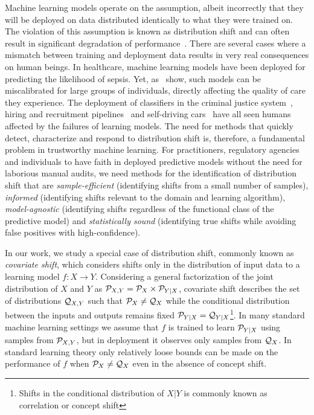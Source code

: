 Machine learning models operate on the assumption, albeit incorrectly that they will be deployed on data distributed identically to what they were trained on.
The violation of this assumption is known as distribution shift and can often result in significant degradation of performance~\citep{cifar101,cifar10C,learnundercov, failloud, mindperfgap, trustuncert}.
There are several cases where a mismatch between training and deployment data results in very real consequences on human beings.
In healthcare, machine learning models have been deployed for predicting the likelihood of sepsis.
Yet, as~\citep{10.1001/jamainternmed.2021.3333} show, such models can be miscalibrated for large groups of individuals, directly affecting the quality of care they experience.
The deployment of classifiers in the criminal justice system~\citep{AIissend45:online}, hiring and recruitment pipelines~\citep{Amazonsc17:online} and self-driving cars~\citep{selfdrive} have all seen humans affected by the failures of learning models.
The need for methods that quickly detect, characterize and respond to distribution shift is, therefore, a fundamental problem in trustworthy machine learning.
For practitioners, regulatory agencies and individuals to have faith in deployed predictive models without the need for laborious manual audits, we need methods for the identification of distribution shift
that are \textit{sample-efficient} (identifying shifts from a small number of samples), \textit{informed} (identifying shifts relevant to the domain and learning algorithm), \textit{model-agnostic}
(identifying shifts regardless of the functional class of the predictive model) and \textit{statistically sound} (identifying true shifts while avoiding false positives with high-confidence).

In our work, we study a special case of distribution shift, commonly known as \textit{covariate shift}, which considers shifts only in the distribution of input data to a learning model $f: X\to Y$.
Considering a general factorization of the joint distribution of $X$ and $Y$ as $\mathcal{P}_{X,Y}=\mathcal{P}_X\times \mathcal{P}_{Y|X}$, covariate shift describes the set of distributions $\mathcal{Q}_{X,Y}$ such that $\mathcal{P}_X \neq \mathcal{Q}_X$ while the conditional distribution between the inputs and outputs remains fixed $\mathcal{P}_{Y|X} = \mathcal{Q}_{Y|X}$\footnote{Shifts in the conditional distribution of $X|Y$ is commonly known as correlation or concept shift}.
In many standard machine learning settings we assume that $f$ is trained to learn $\mathcal{P}_{Y|X}$ using samples from $\mathcal{P}_{X,Y}$, but in deployment it observes only samples from $\mathcal{Q}_X$.
In standard learning theory only relatively loose bounds can be made on the performance of $f$ when $\mathcal{P}_X\neq \mathcal{Q}_X$ even in the absence of concept shift.

